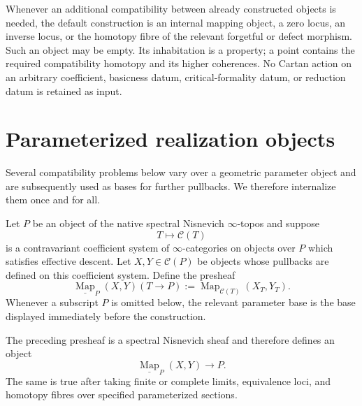 \begin{convention}
\label{conv:symmetry-noether-realization-instead-of-compatibility-hypotheses}
Whenever an additional compatibility between already constructed objects is needed,
the default construction is an internal mapping object, a zero locus, an inverse
locus, or the homotopy fibre of the relevant forgetful or defect morphism.  Such an
object may be empty.  Its inhabitation is a property; a point contains the required
compatibility homotopy and its higher coherences.  No Cartan action on an arbitrary
coefficient, basicness datum, critical-formality datum, or reduction datum is
retained as input.
\end{convention}
\section{Parameterized realization objects}
\label{sec:symmetry-noether-parameterized-realization-objects}

Several compatibility problems below vary over a geometric parameter object and
are subsequently used as bases for further pullbacks.  We therefore internalize
them once and for all.

\begin{construction}
\label{constr:symmetry-noether-parameterized-mapping-object}
Let $P$ be an object of the native spectral Nisnevich $\infty$-topos and suppose
\[
T\longmapsto\mathcal C(T)
\]
is a contravariant coefficient system of $\infty$-categories on objects over $P$
which satisfies effective descent.  Let $X,Y\in\mathcal C(P)$ be objects whose
pullbacks are defined on this coefficient system.  Define the presheaf
\[
\underline{\operatorname{Map}}_P(X,Y)(T\to P)
:=
\operatorname{Map}_{\mathcal C(T)}(X_T,Y_T).
\]
Whenever a subscript $P$ is omitted below, the relevant parameter base is the base
displayed immediately before the construction.
\end{construction}

\begin{lemma}
\label{lem:symmetry-noether-descent-of-parameterized-mapping-objects}
The preceding presheaf is a spectral Nisnevich sheaf and therefore defines an
object
\[
\underline{\operatorname{Map}}_P(X,Y)\longrightarrow P.
\]
The same is true after taking finite or complete limits, equivalence loci, and
homotopy fibres over specified parameterized sections.
\end{lemma}

